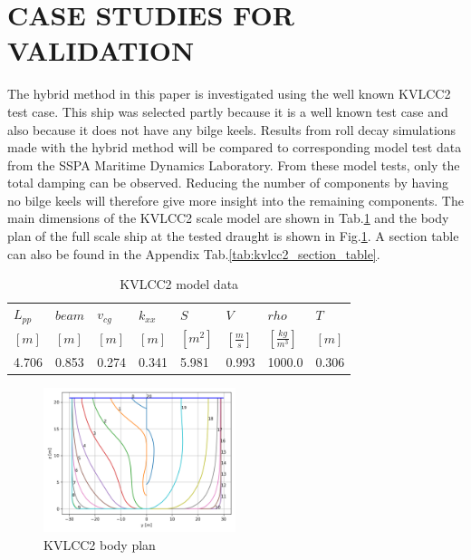 \section*{CASE STUDIES FOR VALIDATION}\label{case-studies-for-validation}
\label{sec:validation}
The hybrid method in this paper is investigated using the well known
KVLCC2 test case. This ship was selected partly because it is a well
known test case and also because it does not have any bilge keels.
Results from roll decay simulations made with the hybrid method will be
compared to corresponding model test data from the SSPA Maritime
Dynamics Laboratory. From these model tests, only the total damping can
be observed. Reducing the number of components by having no bilge keels
will therefore give more insight into the remaining components. The main
dimensions of the KVLCC2 scale model are shown in
Tab.\ref{tab:kvlcc2_model_data} and the body plan of the full
scale ship at the tested draught is shown in
Fig.\ref{fig:body_plan}. A section table can also be found in
the Appendix Tab.\ref{tab:kvlcc2_section_table}.
\begin{table}[H]
\scriptsize
\center
\caption{KVLCC2 model data}
\label{tab:kvlcc2_model_data}
\begin{tabular}{|l|l|l|l|l|l|l|l|}
\hline\addlinespace
$L_{pp}$ & $beam$ & $v_{cg}$ & $k_{xx}$ & $S$ & $V$ & $rho$ & $T$\\
$[m]$ & $[m]$ & $[m]$ & $[m]$ & $[m^2]$ & $\left[\frac{m}{s}\right]$ & $\left[\frac{kg}{m^3}\right]$ & $[m]$\\
\hline4.706 & 0.853 & 0.274 & 0.341 & 5.981 & 0.993 & 1000.0 & 0.306\\
\hline
\end{tabular}
\end{table}
\begin{figure}[H]
\begin{center}\includegraphics[width = 0.5\textwidth]{figures/body_plan.png}\end{center}
\vspace{-1cm}
\caption{KVLCC2 body plan}
\label{fig:body_plan}
\end{figure}
